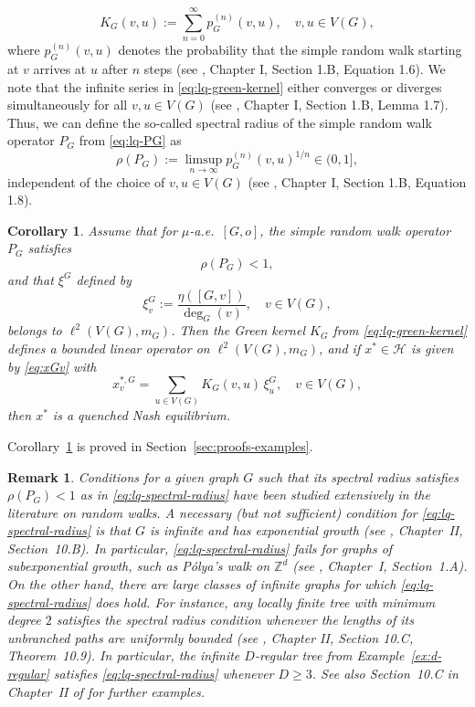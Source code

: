 \documentclass[11pt]{article}
\newcommand{\be}{\begin{equation}}
\newcommand{\ee}{\end{equation}}
\newtheorem{corollary}[theorem]{Corollary}
\newtheorem{remark}[theorem]{Remark}
\numberwithin{equation}{section}
\begin{document}
\begin{equation}\label{eq:lq-green-kernel}
K_G(v,u)
:=
\sum_{n=0}^\infty p_G^{(n)}(v,u),
\quad v,u\in V(G),
\end{equation}
where \(p_G^{(n)}(v,u)\) denotes the probability that the simple random walk starting at $v$ arrives at $u$ after $n$ steps (see \cite{woess2000random}, Chapter I, Section 1.B, Equation 1.6). We note that the infinite series in \eqref{eq:lq-green-kernel} either converges or diverges simultaneously for all $v,u\in V(G)$ (see \cite{woess2000random}, Chapter I, Section 1.B, Lemma 1.7). Thus, we can define the so-called spectral radius of the simple random walk operator $P_G$ from \eqref{eq:lq-PG} as
\be\label{eq:lq-spectral-radius-def}
\rho(P_G):=\limsup_{n\to\infty}p_G^{(n)}(v,u)^{1/n}\in (0,1],
\ee
independent of the choice of $v,u\in V(G)$ (see \cite{woess2000random}, Chapter I, Section 1.B, Equation 1.8).

\begin{corollary}\label{cor:green}
Assume that for \(\mu\)-a.e.~\([G,o]\), the simple random walk operator \(P_G\) satisfies
\be\label{eq:lq-spectral-radius}
\rho(P_G)<1,
\ee
and that $\xi^G$ defined by
\be\label{eq:xi}
\xi^G_v:=\frac{\eta([G,v])}{\deg_G(v)},\quad v\in V(G),
\ee
belongs to \(\ell^2(V(G),m_G)\). Then the Green kernel \(K_G\) from \eqref{eq:lq-green-kernel} defines a bounded linear operator on \(\ell^2(V(G),m_G)\), and if \(x^\ast\in\mathcal H\) is given by \eqref{eq:xGv} with
\begin{equation}\label{eq:lq-green}
x^{\ast,G}_v
=
\sum_{u\in V(G)}K_G(v,u)\,\xi^G_u,
\quad v\in V(G),
\end{equation}
then \(x^\ast\) is a quenched Nash equilibrium.
\end{corollary}
Corollary~\ref{cor:green} is proved in Section~\ref{sec:proofs-examples}.
\begin{remark}
Conditions for a given graph $G$ such that its spectral radius satisfies \(\rho(P_G)<1\)  as in \eqref{eq:lq-spectral-radius} have been studied extensively in the literature on random walks. A necessary (but not sufficient) condition for \eqref{eq:lq-spectral-radius} is that $G$ is infinite and has exponential growth (see \cite{woess2000random}, Chapter~II, Section~10.B). In particular, \eqref{eq:lq-spectral-radius} fails for graphs of subexponential growth, such as P\'olya's walk on $\mathbb{Z}^d$ (see \cite{woess2000random}, Chapter~I, Section~1.A). On the other hand, there are large classes of infinite graphs for which \eqref{eq:lq-spectral-radius} does hold. For instance, any locally finite tree with minimum degree \(2\) satisfies the spectral radius condition whenever the lengths of its unbranched paths are uniformly bounded (see \cite{woess2000random}, Chapter II, Section 10.C, Theorem~10.9). In particular, the infinite $D$-regular tree from Example~\ref{ex:d-regular} satisfies \eqref{eq:lq-spectral-radius} whenever $D\geq 3$. See also Section~10.C in Chapter~II of \cite{woess2000random} for further examples.
\end{remark}
\end{document}
